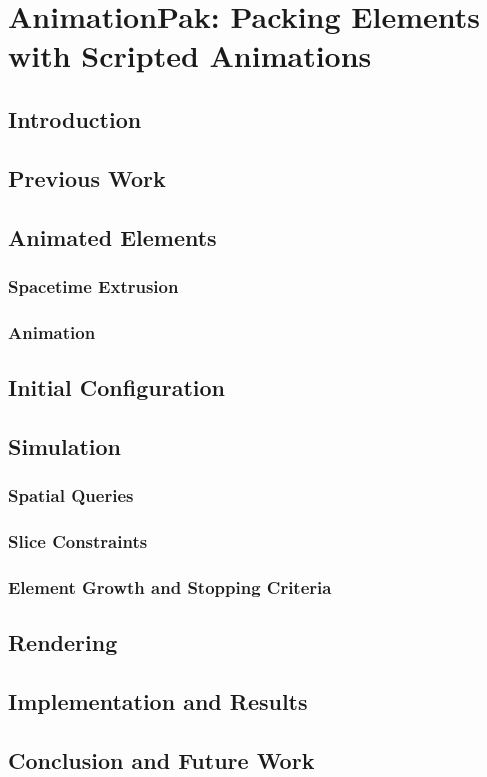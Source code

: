 \chapter{AnimationPak: Packing Elements with Scripted Animations}

\section{Introduction}

\section{Previous Work}

\section{Animated Elements}

\subsection{Spacetime Extrusion}

\subsection{Animation}

\section{Initial Configuration}

\section{Simulation}

\subsection{Spatial Queries}

\subsection{Slice Constraints}

\subsection{Element Growth and Stopping Criteria}

\section{Rendering}

\section{Implementation and Results}

\section{Conclusion and Future Work}
